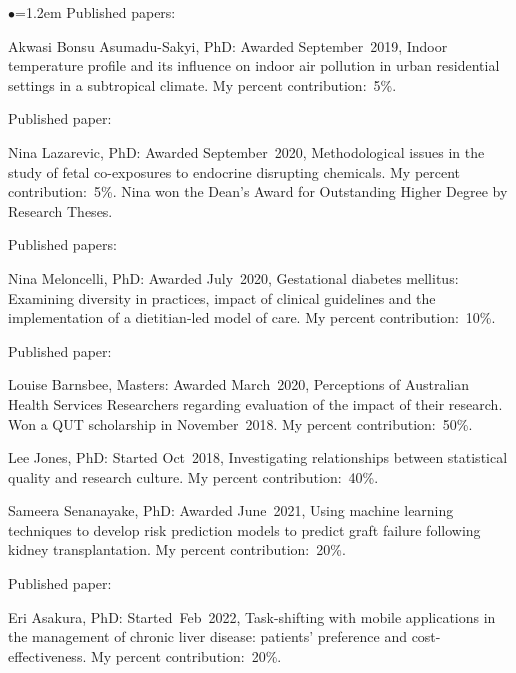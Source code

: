 \documentclass[a4paper,11pt]{article}
\renewcommand{\labelitemi}{$\bullet$}
\begin{document}
\begin{raggedright}
\begin{list}{\labelitemi}{\leftmargin=1.2em}
Published papers: 

\item Akwasi Bonsu Asumadu-Sakyi, PhD: Awarded September~2019, Indoor temperature profile and its influence on indoor air pollution in urban residential settings in a subtropical climate. My percent contribution:~5\%.

Published paper: 

\item Nina Lazarevic, PhD: Awarded September~2020, Methodological issues in the study of fetal co-exposures to endocrine disrupting chemicals. My percent contribution:~5\%. Nina won the Dean’s Award for Outstanding Higher Degree by Research Theses.

 Published papers: 

\item Nina Meloncelli, PhD: Awarded July~2020, Gestational diabetes mellitus: Examining diversity in practices, impact of clinical guidelines and the implementation of a dietitian-led model of care. My percent contribution:~10\%.

Published paper: 

\item Louise Barnsbee, Masters: Awarded March~2020, Perceptions of Australian Health Services Researchers regarding evaluation of the impact of their research. Won a QUT scholarship in November~2018. My percent contribution:~50\%.

\item Lee Jones, PhD: Started Oct~2018, Investigating relationships between statistical quality and research culture. My percent contribution:~40\%.

\item Sameera Senanayake, PhD: Awarded June~2021, Using machine learning techniques to develop risk prediction models to predict graft failure following kidney transplantation. My percent contribution:~20\%.

Published paper: 

% 
\item Eri Asakura, PhD: Started~Feb~2022, Task-shifting with mobile applications in the management of chronic liver disease: patients’ preference and cost-effectiveness. My percent contribution:~20\%.


\end{list}
\end{raggedright}
\end{document}
